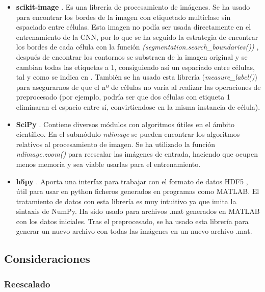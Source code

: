 \begin{itemize}
\item \textbf{scikit-image} \cite{Walt2014}. Es una librería de procesamiento de imágenes. Se ha usado para encontrar los bordes de la imagen con etiquetado multiclase sin espaciado entre células. Esta imagen no podía ser usada directamente en el entrenamiento de la CNN, por lo que se ha seguido la estrategia de encontrar los bordes de cada célula con la función \textit{(segmentation.search\_boundaries())} \cite{Wolny2020}, después de encontrar los contornos se substraen de la imagen original y se cambian todas las etiquetas a 1, consiguiendo así un espaciado entre células, tal y como se indica en \cite{Falk2019}. También se ha usado esta librería (\textit{measure\_label()}) para asegurarnos de que el nº de células no varía al realizar las operaciones de preprocesado (por ejemplo, podría ser que dos células con etiqueta 1 eliminaran el espacio entre sí, convirtiendose en la misma instancia de célula).
\item \textbf{SciPy} \cite{Virtanen2020}. Contiene diversos módulos con algoritmos útiles en el ámbito científico. En el submódulo \textit{ndimage} se pueden encontrar los algoritmos relativos al procesamiento de imagen. Se ha utilizado la función \textit{ndimage.zoom()} para reescalar las imágenes de entrada, haciendo que ocupen menos memoria y sea viable usarlas para el entrenamiento.
\item \textbf{h5py} \cite{Collette2013}. Aporta una interfaz para trabajar con el formato de datos HDF5 \cite{HDFGroup20002010}, útil para usar en python ficheros generados en programas como MATLAB. El tratamiento de datos con esta librería es muy intuitivo ya que imita la sintaxis de NumPy. Ha sido usado para archivos .mat generados en MATLAB con los datos iniciales. Tras el preprocesado, se ha usado esta librería para generar un nuevo archivo con todas las imágenes en un nuevo archivo .mat.
\end{itemize}

\subsection{Consideraciones}
\subsubsection{Reescalado}

